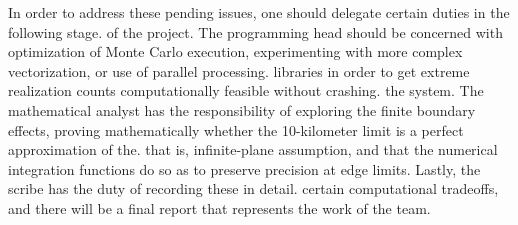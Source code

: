 \documentclass[12pt,a4paper]{article}
\begin{document}
In order to address these pending issues, one should delegate certain duties in the following stage. of the project. The programming head should be concerned with optimization of Monte Carlo execution, experimenting with more complex vectorization, or use of parallel processing. libraries in order to get extreme realization counts computationally feasible without crashing. the system. The mathematical analyst has the responsibility of exploring the finite boundary effects, proving mathematically whether the 10-kilometer limit is a perfect approximation of the. that is, infinite-plane assumption, and that the numerical integration functions do so as to preserve precision at edge limits. Lastly, the scribe has the duty of recording these in detail. certain computational tradeoffs, and there will be a final report that represents the work of the team. 
\end{document}

